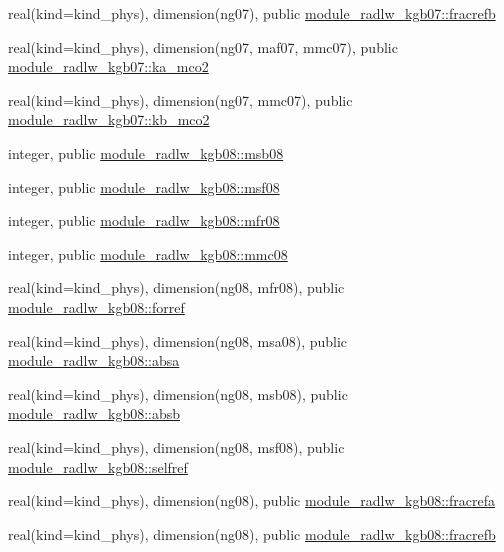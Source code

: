 \begin{DoxyCompactItemize}
\item 
real(kind=kind\+\_\+phys), dimension(ng07), public \hyperlink{group__module__radlw__main_gaa16eb60406e5a298e380b55af528791a}{module\+\_\+radlw\+\_\+kgb07\+::fracrefb}
\item 
real(kind=kind\+\_\+phys), dimension(ng07, maf07, mmc07), public \hyperlink{group__module__radlw__main_ga3fdad494f3d3fcf9306da6a81d97bd43}{module\+\_\+radlw\+\_\+kgb07\+::ka\+\_\+mco2}
\item 
real(kind=kind\+\_\+phys), dimension(ng07, mmc07), public \hyperlink{group__module__radlw__main_ga2dcfbe76332d559cda48c7ba065ab349}{module\+\_\+radlw\+\_\+kgb07\+::kb\+\_\+mco2}
\item 
integer, public \hyperlink{group__module__radlw__main_ga3dd391fcce47d3aca3512bbfd946807b}{module\+\_\+radlw\+\_\+kgb08\+::msb08}
\item 
integer, public \hyperlink{group__module__radlw__main_ga7db22d5a0ece1b1f10cbf64ae1181a09}{module\+\_\+radlw\+\_\+kgb08\+::msf08}
\item 
integer, public \hyperlink{group__module__radlw__main_gabfaf0cad62f8ae42564f8127198d48f0}{module\+\_\+radlw\+\_\+kgb08\+::mfr08}
\item 
integer, public \hyperlink{group__module__radlw__main_ga9e3bfc1880221c18fa07817eb62bcc47}{module\+\_\+radlw\+\_\+kgb08\+::mmc08}
\item 
real(kind=kind\+\_\+phys), dimension(ng08, mfr08), public \hyperlink{group__module__radlw__main_ga8427ec5170f6a61a008a8580be6fe5ec}{module\+\_\+radlw\+\_\+kgb08\+::forref}
\item 
real(kind=kind\+\_\+phys), dimension(ng08, msa08), public \hyperlink{group__module__radlw__main_gaba1018958264bbc6fbf7f190fea91fa5}{module\+\_\+radlw\+\_\+kgb08\+::absa}
\item 
real(kind=kind\+\_\+phys), dimension(ng08, msb08), public \hyperlink{group__module__radlw__main_ga23d4352fcafb0394d723e2f080a84ece}{module\+\_\+radlw\+\_\+kgb08\+::absb}
\item 
real(kind=kind\+\_\+phys), dimension(ng08, msf08), public \hyperlink{group__module__radlw__main_ga2c38561d26f86f7ae515b433843c4e5d}{module\+\_\+radlw\+\_\+kgb08\+::selfref}
\item 
real(kind=kind\+\_\+phys), dimension(ng08), public \hyperlink{group__module__radlw__main_gad1a59ffb362cd72537df9c1916c07621}{module\+\_\+radlw\+\_\+kgb08\+::fracrefa}
\item 
real(kind=kind\+\_\+phys), dimension(ng08), public \hyperlink{group__module__radlw__main_ga0ae7e4c01034a2b95c03b041537b962e}{module\+\_\+radlw\+\_\+kgb08\+::fracrefb}

\end{DoxyCompactItemize}
